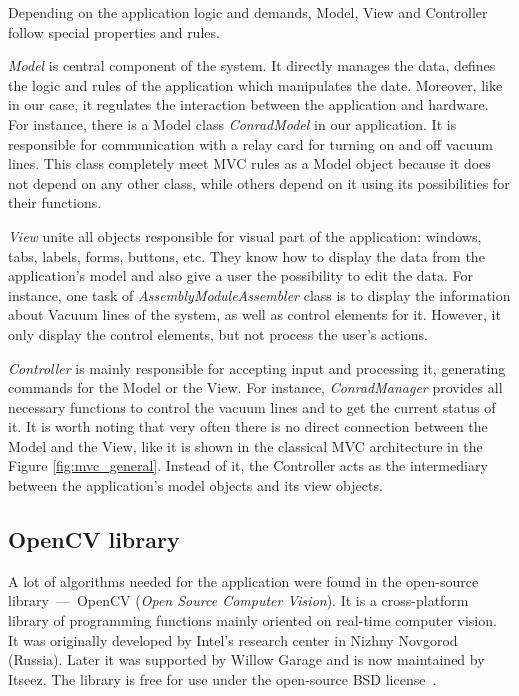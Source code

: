 Depending on the application logic and demands, Model, View and Controller follow special properties and rules.

\emph{Model} is central component of the system. It directly manages the data, defines the logic and rules of the application which manipulates the date. Moreover, like in our case, it regulates the interaction between the application and hardware. For instance, there is a Model class \emph{ConradModel} in our application. It is responsible for communication with a relay card for turning on and off vacuum lines. This class completely meet MVC rules as a Model object because it does not depend on any other class, while others depend on it using its possibilities for their functions.

\emph{View} unite all objects responsible for visual part of the application: windows, tabs, labels, forms, buttons, etc. They know how to display the data from the application's model and also give a user the possibility to edit the data. For instance, one task of \emph{AssemblyModuleAssembler} class is to display the information about Vacuum lines of the system, as well as control elements for it. However, it only display the control elements, but not process the user's actions.

\emph{Controller} is mainly responsible for accepting input and processing it, generating commands for the Model or the View. For instance, \emph{ConradManager} provides all necessary functions to control the vacuum lines and to get the current status of it. It is worth noting that very often there is no direct connection between the Model and the View, like it is shown in the classical MVC architecture in the Figure \ref{fig:mvc_general}. Instead of it, the Controller acts as the intermediary between the application's model objects and its view objects.

\subsection{OpenCV library}

A lot of algorithms needed for the application were found in the open-source library~---~OpenCV (\textit{Open Source Computer Vision}). It is a cross-platform library of programming functions mainly oriented on real-time computer vision. It was originally developed by Intel's research center in Nizhny Novgorod (Russia). Later it was supported by Willow Garage and is now maintained by Itseez. The library is free for use under the open-source BSD license~\cite{OpenCV_general}.

